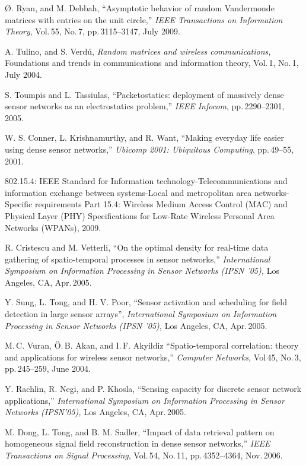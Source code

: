 \documentclass[11pt, draftcls, onecolumn, a4paper]{IEEEtran}
\begin{document}
\begin{thebibliography}{99}
 \O. Ryan, and M. Debbah, ``Asymptotic behavior of
  random Vandermonde matrices with entries on the unit circle,'' {\em
    IEEE Transactions on Information Theory}, Vol.\,55, No.\,7,
  pp.\,3115--3147, July 2009.


 A. Tulino, and S. Verd\'u, {\em Random matrices and
  wireless communications,} Foundations and trends in
    communications and information theory, Vol.\,1, No.\,1, July 2004.


 S. Toumpis and L. Tassiulas,
``Packetostatics: deployment of massively dense sensor networks as an electrostatics problem,'' {\em IEEE Infocom}, pp.\,2290--2301, 2005.  

 W. S. Conner, L. Krishnamurthy, and R. Want, 
``Making everyday life easier using dense sensor 
networks,'' {\em Ubicomp 2001: Ubiquitous Computing}, pp.\,49--55, 2001.

 802.15.4: IEEE Standard for Information
  technology-Telecommunications and information exchange between
  systems-Local and metropolitan area networks-Specific requirements
  Part 15.4: Wireless Medium Access Control (MAC) and Physical Layer
  (PHY) Specifications for Low-Rate Wireless Personal Area Networks
  (WPANs), 2009.

 R. Cristescu and M. Vetterli,
``On the optimal density for real-time data gathering of spatio-temporal
processes in sensor networks,''
{\em International Symposium on Information Processing in Sensor Networks (IPSN '05),}
Los Angeles, CA, Apr.\,2005.

 Y. Sung, L. Tong, and H. V. Poor,
``Sensor activation and scheduling for field detection in large sensor arrays'',
{\em International Symposium on Information Processing in Sensor Networks (IPSN '05),}
Los Angeles, CA, Apr.\,2005.

M.\,C. Vuran, \"O.\,B. Akan, and I.\,F. Akyildiz
``Spatio-temporal correlation: theory and applications for wireless sensor networks,''
{\em Computer Networks,} Vol\,45, No.\,3, pp.\,245--259, June 2004.

 Y. Rachlin, R. Negi, and P. Khosla,
``Sensing capacity for discrete sensor network applications,''
{\em International Symposium on Information Processing in
Sensor Networks (IPSN'05),}  Los Angeles, CA, Apr.\,2005.

 M. Dong, L. Tong, and B. M. Sadler, ``Impact of
  data retrieval pattern on homogeneous signal field reconstruction in
  dense sensor networks,'' {\em IEEE Transactions on Signal
    Processing}, Vol.\,54, No.\,11, pp.\,4352--4364, Nov.\,2006.



\end{thebibliography}
\end{document}
